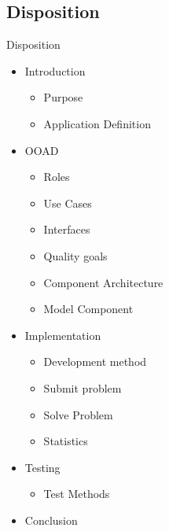 \subsection*{Disposition}
\begin{frame}{Disposition}
\begin{itemize}
	
	
	\item Introduction
	\begin{itemize}
		\item Purpose 
		\item Application Definition 
	\end{itemize}
	\item<2-> OOAD 
	\begin{itemize}
		\item<2->  Roles 
		\item<2->  Use Cases 
		\item<2->  Interfaces 
		\item<2->  Quality goals 
		\item<2->  Component Architecture 
		\item<2->  Model Component	
	\end{itemize}
	\item<3-> Implementation 
	\begin{itemize}
		\item<3-> Development method 
		\item<3-> Submit problem 
		\item<3-> Solve Problem 
		\item<3-> Statistics 
	\end{itemize}	
	\item<4-> Testing 
	\begin{itemize}
		\item<4-> Test Methods 
	\end{itemize}
	\item<5-> Conclusion 
\end{itemize}
\end{frame}